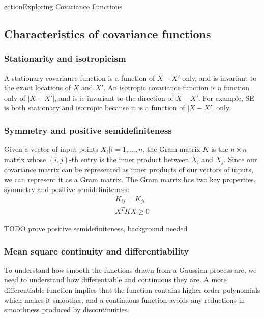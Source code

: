 ection{Exploring Covariance Functions \cite{gp-ml}}


\subsection{Characteristics of covariance functions \cite{gp-ml}}

\subsubsection{Stationarity and isotropicism}
A stationary covariance function is a function of $X - X'$ only, and is invariant to the exact locations of $X$ and $X'$. An isotropic covariance function is a function only of $|X - X'|$, and is is invariant to the direction of $X - X'$. For example, SE \cite{eq:se} is both stationary and isotropic because it is a function of $|X - X'|$ only.

\subsubsection{Symmetry and positive semidefiniteness}
Given a vector of input points ${X_i | i = 1, ..., n}$, the Gram matrix $K$ is the $n \times n$ matrix whose $(i,j)$-th entry is the inner product between $X_i$ and $X_j$. Since our covariance matrix can be represented as inner products of our vectors of inputs, we can represent it as a Gram matrix. The Gram matrix has two key properties, symmetry and positive semidefiniteness:
\begin{equation*}
    \begin{aligned}
        K_{ij} = K_{ji} \\
        X^T K X \geq 0
    \end{aligned}
\end{equation*}

TODO prove positive semidefiniteness, background needed

\subsubsection{Mean square continuity and differentiability}

To understand how smooth the functions drawn from a Gaussian process are, we need to understand how differentiable and continuous they are. A more differentiable function implies that the function contains higher order polynomials which makes it smoother, and a continuous function avoids any reductions in smoothness produced by discontinuities.

